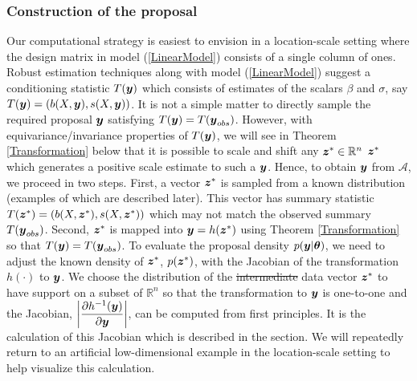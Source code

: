 \documentclass[11pt]{article}
\def\bth{\mbox{\boldmath $\theta$}}
\newcommand{\by}{\mbox{\boldmath $y$}}
\newcommand{\bz}{\mbox{\boldmath $z$}}
\newcommand{\green}[1]{{\color{green}#1}}
\begin{document}
\subsubsection{Construction of the proposal}
Our \green{computational} strategy is easiest to envision in a location-scale setting where 
the design matrix in model (\ref{LinearModel}) consists of a single column of ones.  Robust estimation techniques along
with model (\ref{LinearModel}) suggest a conditioning statistic $T(\by)$ which consists of
estimates of the scalars $\beta$ and $\sigma$, say $T(\by)=(b(X,\by),
s(X,\by))$.  It is not a simple matter to directly sample the required
proposal $\by$ satisfying $T(\by)=T(\by_{obs})$. However, 
  with equivariance/invariance properties of $T(\by)$, we will see in Theorem \ref{Transformation} below
    that it is possible to scale and shift any \sout{$\bz^{*}\in \mathbb R^{n}$} \green{$\bz^{*}$ which generates 
a positive scale estimate} to such a
    $\by$. Hence, to obtain $\by$ from $\mathcal A$, we proceed
  in two steps. First, a vector $\bz^*$ is sampled from a known
  distribution (examples of which are described later). This vector has summary statistic   
$T(\bz^*) = (b(X,\bz^*), s(X,\bz^*))$ which may not match the observed summary
$T(\by_{obs})$.  Second, $\bz^*$ is mapped into $\by =h(\bz^*)$
using Theorem \ref{Transformation} so that $T(\by)=T(\by_{obs})$. To
evaluate the proposal density $p(\by|\bth)$, we need to adjust
the known density of $\bz^*$, $p(\bz^*)$, with the Jacobian of
the transformation $h(\cdot)$ to $\by$. We choose the
distribution of the \green{\sout{intermediate}} data vector $\bz^*$ to have support
\green{on a subset of $\mathbb R^n$ so that}
the transformation to $\by$ is one-to-one and the Jacobian,
$\displaystyle \left|\frac{\partial h^{-1}(\by)}{\partial \by}\right|$, can be computed from first principles. It is the calculation of this Jacobian which is described in the section. We will repeatedly return to an artificial low-dimensional example in the location-scale setting to help visualize this calculation.  

\end{document}
